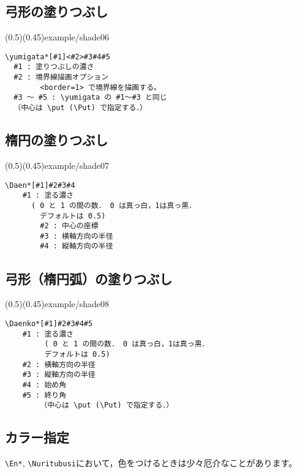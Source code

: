 \subsection{弓形の塗りつぶし}
\showexample[弓形の塗りつぶし](0.5)(0.45){example/shade06}

\begin{boxnote}
\begin{verbatim}
\yumigata*[#1]<#2>#3#4#5
  #1 : 塗りつぶしの濃さ
  #2 : 境界線描画オプション
        <border=1> で境界線を描画する。
  #3 〜 #5 : \yumigata の #1〜#3 と同じ
  （中心は \put (\Put) で指定する．）
\end{verbatim}
\end{boxnote}


\subsection{楕円の塗りつぶし}
\showexample[楕円の塗りつぶし](0.5)(0.45){example/shade07}

\begin{boxnote}
\begin{verbatim}
\Daen*[#1]#2#3#4
    #1 : 塗る濃さ 
      ( 0 と 1 の間の数． 0 は真っ白，1は真っ黒．
        デフォルトは 0.5)
        #2 : 中心の座標
        #3 : 横軸方向の半径
        #4 : 縦軸方向の半径
\end{verbatim}
\end{boxnote}


\subsection{弓形（楕円弧）の塗りつぶし}
(0.5)(0.45){example/shade08}

\begin{boxnote}
\begin{verbatim}
\Daenko*[#1]#2#3#4#5
    #1 : 塗る濃さ 
         ( 0 と 1 の間の数． 0 は真っ白，1は真っ黒．
         デフォルトは 0.5)
    #2 : 横軸方向の半径
    #3 : 縦軸方向の半径
    #4 : 始め角
    #5 : 終り角
        （中心は \put (\Put) で指定する．）
\end{verbatim}
\end{boxnote}

\subsection{カラー指定}
\edef\saveUL{\the\unitlength}%
\unitlength=1pt\relax
\verb+\En*+, \verb+\Nuritubusi+において，色をつけるときは少々厄介なことがあります。
